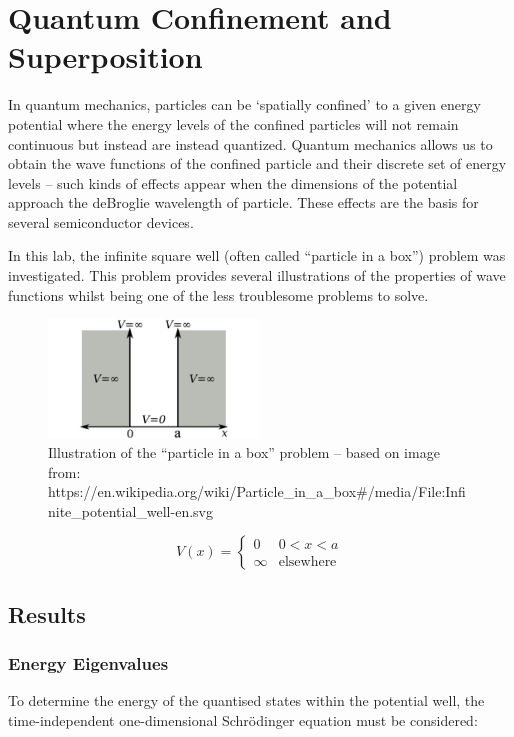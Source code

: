 \chapter{Quantum Confinement and Superposition}

In quantum mechanics, particles can be `spatially confined' to a given energy potential where the energy levels of the confined particles will not remain continuous but instead are instead quantized.
Quantum mechanics allows us to obtain the wave functions of the confined particle and their discrete set of energy levels -- such kinds of effects appear when the dimensions of the potential approach the deBroglie wavelength of particle. These effects are the basis for several semiconductor devices.

In this lab, the infinite square well (often called ``particle in a box'') problem was investigated. This problem provides several illustrations of the properties of wave functions whilst being one of the less troublesome problems to solve.

\begin{figure}[h]
    \centering
    \includegraphics[width=0.5\textwidth]{lab1/images/pIAB.png}
    \captionsetup{font = it, labelfont = bf, width=.91\linewidth, justification=centering}
    \caption{Illustration of the ``particle in a box'' problem -- based on image from:\\ https://en.wikipedia.org/wiki/Particle\_in\_a\_box\#/media/File:Infinite\_potential\_well-en.svg}
    \label{fig:particleInABox}
\end{figure}

\[
  V(x) = \begin{cases}
  0 & 0 < x < a\\
  \infty & \text{elsewhere}
\end{cases}
\]
   
\section{Results}
\subsection{Energy Eigenvalues}
To determine the energy of the quantised states within the potential well, the time-independent one-dimensional Schrödinger equation must be considered:

